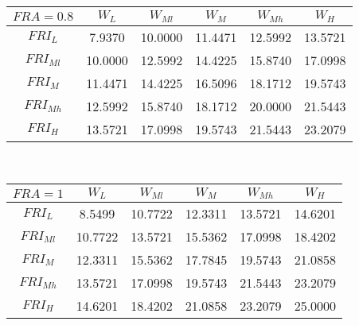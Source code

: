 \begin{table}[h]
    	
    	\begin{tabular}{|c||c|c|c|c|c|}
    		\hline
    		$FRA=0.8$	 &$W_L$&$W_{Ml}$&$W_M$&$W_{Mh}$&$W_H$\\
			\hline  
    		\hline  
    		$FRI_L$&7.9370  & 10.0000 &  11.4471  & 12.5992  & 13.5721\\
    		$FRI_{Ml}$&10.0000 &  12.5992 &  14.4225 &  15.8740 &  17.0998\\
    		$FRI_M$&11.4471 &  14.4225 &  16.5096 &  18.1712 &  19.5743\\
    		$FRI_{Mh}$&12.5992 &  15.8740 &  18.1712 &  20.0000 &  21.5443\\
    		$FRI_H$&13.5721 &  17.0998 &  19.5743 &  21.5443 &  23.2079\\
    		\hline 
    	\end{tabular} 
    	\bigskip
    	\\
    	\pagebreak
    	\begin{tabular}{|c||c|c|c|c|c|}
    		\hline
    		$FRA=1$	 &$W_L$&$W_{Ml}$&$W_M$&$W_{Mh}$&$W_H$\\
    		\hline  
    		\hline  
    		$FRI_L$&8.5499  & 10.7722 &  12.3311  & 13.5721 &  14.6201\\
    		$FRI_{Ml}$&10.7722 &  13.5721 &  15.5362 &  17.0998 &  18.4202\\
    		$FRI_M$&12.3311 & 15.5362  & 17.7845  & 19.5743  & 21.0858\\
    		$FRI_{Mh}$&13.5721 &  17.0998 &  19.5743 &  21.5443 &  23.2079\\
    		$FRI_H$&14.6201 &  18.4202 &  21.0858 &  23.2079 &  25.0000\\
    		\hline 
    	\end{tabular} 
    	\bigskip
    	\\
    \end{table}
\clearpage

